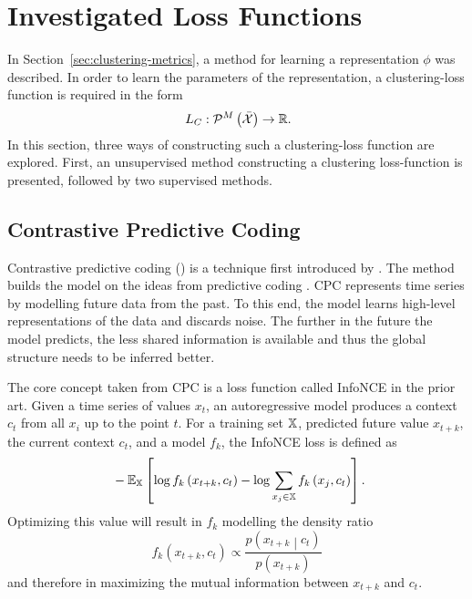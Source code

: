 \section{Investigated Loss Functions}\label{sec:loss-functions}

In Section~\ref{sec:clustering-metrics}, a method for learning a representation \( \phi \) was described. In order to learn the parameters of the representation, a clustering-loss function is required in the form
\[ \phantom{.}L_C : \mathcal{P}^M \left( \bar{\mathcal{X}} \right) \to \mathbb{R}. \]
In this section, three ways of constructing such a clustering-loss function are explored. First, an unsupervised method constructing a clustering loss-function is presented, followed by two supervised methods.

\subsection{Contrastive Predictive Coding}
Contrastive predictive coding () is a technique first introduced by \cite{oord_representation_2019}. The method builds the model on the ideas from predictive coding \cite{elias_predictive_1955}. CPC represents time series by modelling future data from the past. To this end, the model learns high-level representations of the data and discards noise. The further in the future the model predicts, the less shared information is available and thus the global structure needs to be inferred better.

The core concept taken from CPC is a loss function called InfoNCE in the prior art. Given a time series of values \( x_t \), an autoregressive model produces a context \( c_t \) from all \( x_i \) up to the point \( t \). For a training set \( \mathbb{X} \), predicted future value \( x_{t + k} \), the current context \( c_t \), and a model \( f_k \), the InfoNCE loss is defined as
\[ \phantom{.}- \mathbb{E}_\mathset{X} \left[ \log f_k \left( x_{t + k}, c_t \right) - \log \sum_{x_j \in \mathset{X}} f_k \left( x_j, c_t \right) \right]. \]
Optimizing this	value will result in \( f_k \) modelling the density ratio
\[ f_k \left( x_{t + k}, c_t \right) \propto \frac{p \left( x_{t + k} \middle| c_t \right)}{p \left( x_{t + k} \right)} \]
and therefore in maximizing the mutual information between \( x_{t + k} \) and \( c_t \).

